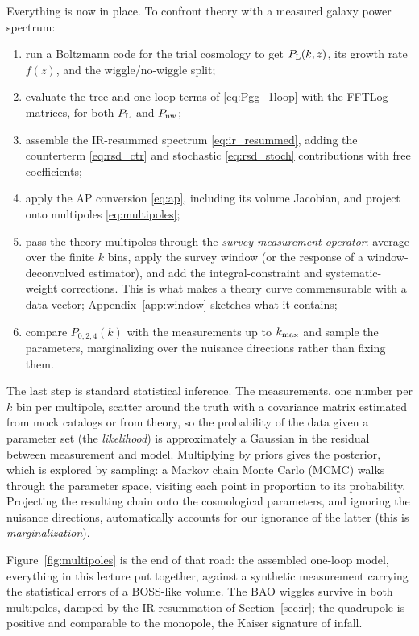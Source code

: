 \documentclass[a4paper,11pt]{article}
\def\Plin{P_{\rm L}}
\numberwithin{equation}{section}
\begin{document}
Everything is now in place. To confront theory with a measured galaxy power spectrum:
\begin{enumerate}[itemsep=1pt,topsep=2pt]
\item run a Boltzmann code for the trial cosmology to get $\Plin(k,z)$, its growth rate $f(z)$, and the wiggle/no-wiggle split;
\item evaluate the tree and one-loop terms of \eqref{eq:Pgg_1loop} with the FFTLog matrices, for both $\Plin$ and $P_{\rm nw}$;
\item assemble the IR-resummed spectrum \eqref{eq:ir_resummed}, adding the counterterm \eqref{eq:rsd_ctr} and stochastic \eqref{eq:rsd_stoch} contributions with free coefficients;
\item apply the AP conversion \eqref{eq:ap}, including its volume Jacobian, and project onto multipoles \eqref{eq:multipoles};
\item pass the theory multipoles through the \emph{survey measurement operator}: average over the finite $k$ bins, apply the survey window (or the response of a window-deconvolved estimator), and add the integral-constraint and systematic-weight corrections. This is what makes a theory curve commensurable with a data vector; Appendix~\ref{app:window} sketches what it contains;
\item compare $P_{0,2,4}(k)$ with the measurements up to $k_{\rm max}$ and sample the parameters, marginalizing over the nuisance directions rather than fixing them.
\end{enumerate}
The last step is standard statistical inference. The measurements, one number per $k$ bin per multipole, scatter around the truth with a covariance matrix estimated from mock catalogs or from theory, so the probability of the data given a parameter set (the \emph{likelihood}) is approximately a Gaussian in the residual between measurement and model. Multiplying by priors gives the posterior, which is explored by sampling: a Markov chain Monte Carlo (MCMC) walks through the parameter space, visiting each point in proportion to its probability. Projecting the resulting chain onto the cosmological parameters, and ignoring the nuisance directions, automatically accounts for our ignorance of the latter (this is \emph{marginalization}).

Figure~\ref{fig:multipoles} is the end of that road: the assembled one-loop model, everything in this lecture put together, against a synthetic measurement carrying the statistical errors of a BOSS-like volume. The BAO wiggles survive in both multipoles, damped by the IR resummation of Section~\ref{sec:ir}; the quadrupole is positive and comparable to the monopole, the Kaiser signature of infall.
\end{document}
